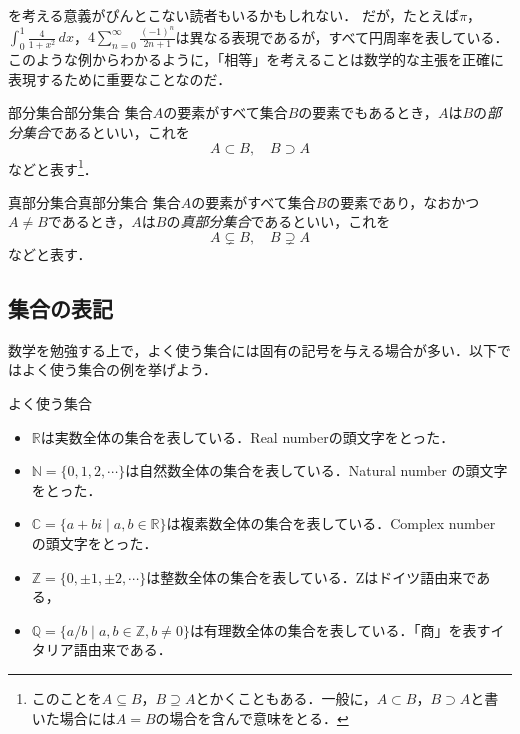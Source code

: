 \begin{mycolumn}
  を考える意義がぴんとこない読者もいるかもしれない．
  だが，たとえば$\pi$，$\int_{0}^{1} \frac{4}{1+x^2} \, dx$，$4 \sum_{n=0}^{\infty} \frac{(-1)^n}{2n+1}$は異なる表現であるが，すべて円周率を表している．
  このような例からわかるように，「相等」を考えることは数学的な主張を正確に表現するために重要なことなのだ．
\end{mycolumn}

\begin{definition}{部分集合}{部分集合}
  集合$A$の要素がすべて集合$B$の要素でもあるとき，$A$は$B$の\emph{部分集合}であるといい，これを
  \[
    A \subset B,\quad B \supset A
  \]
  などと表す\footnote{このことを$ A \subseteq B$，$B \supseteq A$とかくこともある．一般に，$A \subset B$，$ B \supset A$と書いた場合には$A=B$の場合を含んで意味をとる．}．
\end{definition}

\begin{definition}{真部分集合}{真部分集合}
  集合$A$の要素がすべて集合$B$の要素であり，なおかつ$A \ne B$であるとき，$A$は$B$の\emph{真部分集合}であるといい，これを
  \[
    A \subsetneq B,\quad B \supsetneq A
  \]
  などと表す．
\end{definition}

\subsection{集合の表記}

数学を勉強する上で，よく使う集合には固有の記号を与える場合が多い．以下ではよく使う集合の例を挙げよう．

\begin{shadebox}
  よく使う集合
  \begin{itemize}
    \item $\mathbb{R}$は実数全体の集合を表している．Real numberの頭文字をとった．
    \item $\mathbb{N}=\{0,1,2,\cdots \}$は自然数全体の集合を表している．Natural number の頭文字をとった．
    \item $\mathbb{C}=\{ a+bi \mid a,b \in \mathbb{R}\}$は複素数全体の集合を表している．Complex number の頭文字をとった．
    \item $\mathbb{Z}=\{0, \pm 1 , \pm 2 , \cdots\}$は整数全体の集合を表している．Zはドイツ語由来である，
    \item $\mathbb{Q}=\{ a/b \mid   a,b \in \mathbb{Z},b \ne 0 \}$は有理数全体の集合を表している．「商」を表すイタリア語由来である．
  \end{itemize}
\end{shadebox}


